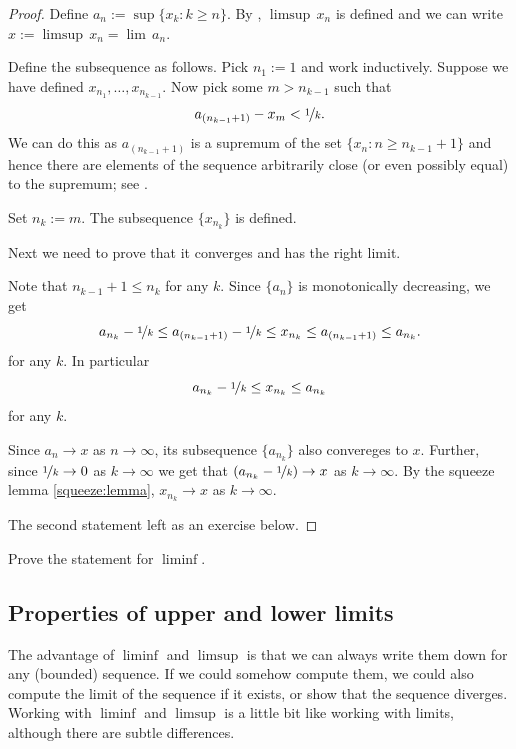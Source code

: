 \documentclass[12pt]{book}
\begin{document}
\begin{proof}
Define $a_n := \sup \{ x_k : k \geq n \}$.
By , $\limsup \, x_n$ is defined and we can write 
$x := \limsup \, x_n = \lim\, a_n$.

Define the subsequence as follows.
Pick $n_1 := 1$ and work inductively.
Suppose we have
defined $x_{n_1},\dots,x_{n_{k-1}}$.
Now pick some $m > n_{k-1}$
such that
\begin{equation*}
a_{(n_{k-1}+1)} - x_m < \nicefrac1k .
\end{equation*}
We can do this as $a_{(n_{k-1}+1)}$ is a supremum of the
set $\{ x_n : n \geq n_{k-1} + 1 \}$ and hence there are elements
of the sequence arbitrarily close (or even possibly equal) to the supremum; see .

Set $n_k :=  m$.
The subsequence $\{ x_{n_k} \}$ is defined.

Next we need to prove that it converges and has the right limit.

Note that $n_{k-1}+1\le n_k$ for any $k$.
Since $\{a_n\}$ is monotonically decreasing, we get
\[a_{n_k}-\nicefrac1k\le a_{(n_{k-1}+1)}-\nicefrac1k\le x_{n_k}\le a_{(n_{k-1}+1)} \le a_{n_k}.\]
for any $k$.
In particular 
\[a_{n_k}-\nicefrac1k\le x_{n_k}\le a_{n_k}\]
for any $k$.

Since  $a_n\to x$ as $n\to \infty$, 
its subsequence $\{a_{n_k}\}$ also convereges to $x$.
Further, since $\nicefrac1k\to0$ as $k\to\infty$ we get that $(a_{n_k}-\nicefrac1k)\to x$ as $k\to\infty$.
By the squeeze lemma \ref{squeeze:lemma}, $x_{n_k}\to x$ as $k\to \infty$.

The second statement left as an exercise below.
\end{proof}

\begin{exercise}
Prove the statement for $\liminf$.
\end{exercise}

\subsection*{Properties of upper and lower limits}

The advantage of $\liminf$ and $\limsup$ is that we can always write them
down for any (bounded) sequence.
If we could somehow compute them, we could also compute the limit of the
sequence if it exists, or show that the sequence diverges.
Working with $\liminf$ and $\limsup$ is a
little bit like working with limits, although there are subtle differences.
\end{document}
